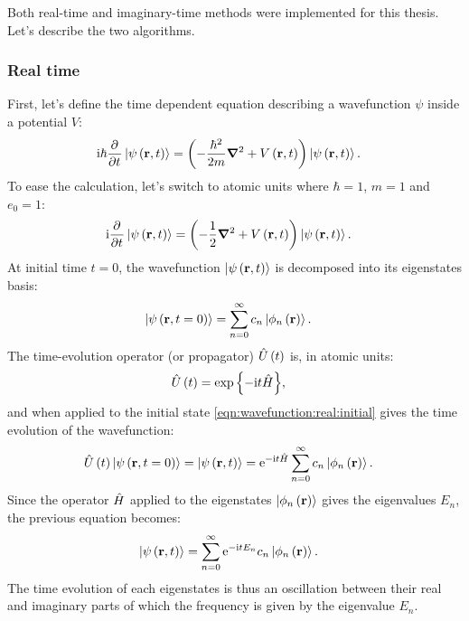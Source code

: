 Both real-time and imaginary-time methods were implemented for this thesis. Let's describe the
two algorithms.


\subsubsection{Real time}

First, let's define the time dependent \schrodinger equation describing a
wavefunction $\psi$ inside a potential $V$:
\begin{align}
\textrm{i} \hbar \frac{\partial^{{}}   }{\partial t^{{}}} \left| \psi\left( \textbf{r}, t \right) \right>
    & = \left( -\frac{\hbar^2}{2 m} \bm{\nabla}^2 + V\left( \textbf{r}, t \right)  \right) \left| \psi\left( \textbf{r},
t \right) \right>.
\label{eqn:schrodinger:si}
\end{align}
To ease the calculation, let's switch to atomic units where $\hbar = 1$, $m
= 1$ and $e_0 = 1$:
\begin{align}
\textrm{i} \frac{\partial^{{}}   }{\partial t^{{}}} \left| \psi\left( \textbf{r}, t \right) \right>
    & = \left( -\frac{1}{2} \bm{\nabla}^2 + V\left( \textbf{r}, t \right)  \right) \left| \psi\left( \textbf{r}, t \right) \right>.
\label{eqn:schrodinger:au}
\end{align}
At initial time $t = 0$, the wavefunction $\left| \psi\left( \textbf{r}, t \right) \right>$ is
decomposed into its eigenstates basis:
\begin{align}
\left| \psi\left( \textbf{r}, t=0 \right) \right> & = \sum_{n=0}^{\infty} c_n \left| \phi_n\left( \textbf{r} \right) \right>.
\label{eqn:wavefunction:real:initial}
\end{align}
The time-evolution operator (or propagator) $\hat{U}\left( t \right)$ is, in atomic units:
\begin{align}
\hat{U}\left( t \right) & = \exp{ \left\{  - \textrm{i}t  \hat{H} \right\}},
\label{eqn:propagator:real}
\end{align}
and when applied to the initial state \eqref{eqn:wavefunction:real:initial}
gives the time evolution of the wavefunction:
\begin{align}
\hat{U}\left( t \right) \left| \psi\left( \textbf{r}, t=0 \right) \right>
    = \left| \psi\left( \textbf{r}, t \right) \right>
  & = \textrm{e}^{ - \textrm{i} t \hat{H} } \sum_{n=0}^{\infty} c_n \left| \phi_n\left( \textbf{r} \right) \right>.
\end{align}
Since the operator $\hat{H}$ applied to the eigenstates
$\left| \phi_n\left( \textbf{r} \right) \right>$ gives the eigenvalues $E_n$, the previous equation
becomes:
\begin{align}
\left| \psi\left( \textbf{r}, t \right) \right>
 & = \sum_{n=0}^{\infty} \textrm{e}^{ - \textrm{i} t E_n } c_n \left| \phi_n\left( \textbf{r} \right) \right>.
\label{eqn:wavefunction:eigenstates:time_evolution:real}
\end{align}
The time evolution of each eigenstates is thus an oscillation between their real
and imaginary parts of which the frequency is given by the eigenvalue $E_n$.



